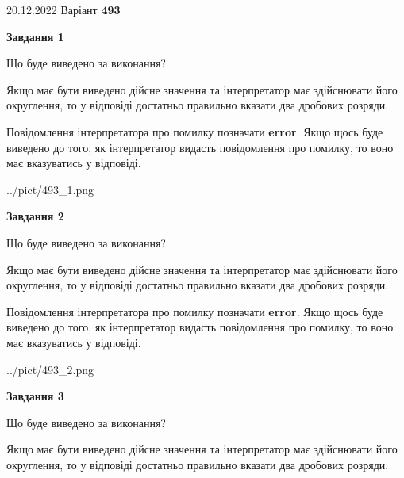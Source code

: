 \documentclass[12pt, ukrainian]{article}
\begin{document}
{20.12.2022 Варіант \No \textbf { 493 }\par}
{
\begin {Large}

{\begin {center}\textbf{Завдання 1}\end {center}}\par
Що буде виведено за виконання? \par

Якщо має бути виведено дійсне значення та інтерпретатор має здійснювати його округлення, 
то у відповіді достатньо правильно вказати два дробових розряди.

Повідомлення інтерпретатора про помилку позначати \textbf{error}.
Якщо щось буде виведено до того, як інтерпретатор видасть повідомлення про помилку, 
то воно має вказуватись у відповіді. \par

\begin{center}
	{../pict/493_1.png}
\end{center}
\newpage

{\begin {center}\textbf{Завдання 2}\end {center}}\par
Що буде виведено за виконання? \par

Якщо має бути виведено дійсне значення та інтерпретатор має здійснювати його округлення, 
то у відповіді достатньо правильно вказати два дробових розряди.

Повідомлення інтерпретатора про помилку позначати \textbf{error}.
Якщо щось буде виведено до того, як інтерпретатор видасть повідомлення про помилку, 
то воно має вказуватись у відповіді. \par

\begin{center}
	{../pict/493_2.png}
\end{center}
\newpage

{\begin {center}\textbf{Завдання 3}\end {center}}\par
Що буде виведено за виконання? \par

Якщо має бути виведено дійсне значення та інтерпретатор має здійснювати його округлення, 
то у відповіді достатньо правильно вказати два дробових розряди.


\end{Large}}
\end{document}
